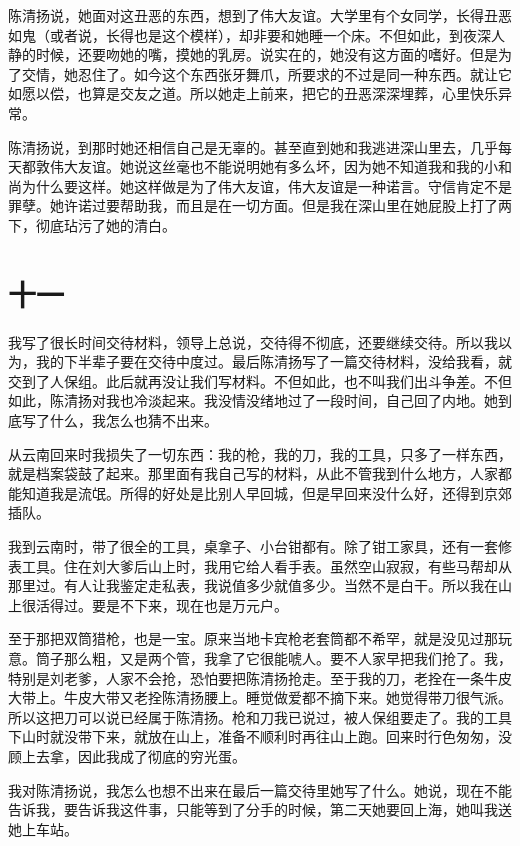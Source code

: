  陈清扬说，她面对这丑恶的东西，想到了伟大友谊。大学里有个女同学，长得丑恶如鬼（或者说，长得也是这个模样），却非要和她睡一个床。不但如此，到夜深人静的时候，还要吻她的嘴，摸她的乳房。说实在的，她没有这方面的嗜好。但是为了交情，她忍住了。如今这个东西张牙舞爪，所要求的不过是同一种东西。就让它如愿以偿，也算是交友之道。所以她走上前来，把它的丑恶深深埋葬，心里快乐异常。 
 
 陈清扬说，到那时她还相信自己是无辜的。甚至直到她和我逃进深山里去，几乎每天都敦伟大友谊。她说这丝毫也不能说明她有多么坏，因为她不知道我和我的小和尚为什么要这样。她这样做是为了伟大友谊，伟大友谊是一种诺言。守信肯定不是罪孽。她许诺过要帮助我，而且是在一切方面。但是我在深山里在她屁股上打了两下，彻底玷污了她的清白。 
 
 
\section{十一} 
 
我写了很长时间交待材料，领导上总说，交待得不彻底，还要继续交待。所以我以为，我的下半辈子要在交待中度过。最后陈清扬写了一篇交待材料，没给我看，就交到了人保组。此后就再没让我们写材料。不但如此，也不叫我们出斗争差。不但如此，陈清扬对我也冷淡起来。我没情没绪地过了一段时间，自己回了内地。她到底写了什么，我怎么也猜不出来。 
 
 从云南回来时我损失了一切东西：我的枪，我的刀，我的工具，只多了一样东西，就是档案袋鼓了起来。那里面有我自己写的材料，从此不管我到什么地方，人家都能知道我是流氓。所得的好处是比别人早回城，但是早回来没什么好，还得到京郊插队。 
 
 我到云南时，带了很全的工具，桌拿子、小台钳都有。除了钳工家具，还有一套修表工具。住在刘大爹后山上时，我用它给人看手表。虽然空山寂寂，有些马帮却从那里过。有人让我鉴定走私表，我说值多少就值多少。当然不是白干。所以我在山上很活得过。要是不下来，现在也是万元户。 
 
 至于那把双筒猎枪，也是一宝。原来当地卡宾枪老套筒都不希罕，就是没见过那玩意。筒子那么粗，又是两个管，我拿了它很能唬人。要不人家早把我们抢了。我，特别是刘老爹，人家不会抢，恐怕要把陈清扬抢走。至于我的刀，老拴在一条牛皮大带上。牛皮大带又老拴陈清扬腰上。睡觉做爱都不摘下来。她觉得带刀很气派。所以这把刀可以说已经属于陈清扬。枪和刀我已说过，被人保组要走了。我的工具下山时就没带下来，就放在山上，准备不顺利时再往山上跑。回来时行色匆匆，没顾上去拿，因此我成了彻底的穷光蛋。 
 
 我对陈清扬说，我怎么也想不出来在最后一篇交待里她写了什么。她说，现在不能告诉我，要告诉我这件事，只能等到了分手的时候，第二天她要回上海，她叫我送她上车站。 
 
